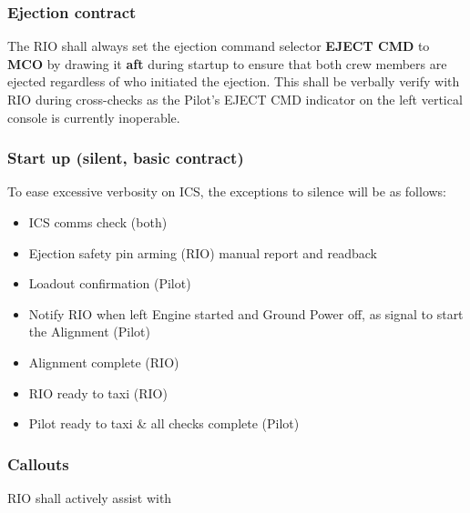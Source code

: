 \subsubsection{Ejection contract}

The RIO shall always set the ejection command selector \textbf{EJECT CMD} to
\textbf{MCO} by drawing it \textbf{aft} during startup to ensure that both crew
members are ejected regardless of who initiated the ejection. This shall be
verbally verify with RIO during cross-checks as the Pilot's EJECT
CMD indicator on the left vertical console is currently inoperable.

\subsubsection{Start up (silent, basic contract)}

To ease excessive verbosity on ICS, the exceptions to silence will be as
follows:

\begin{itemize}
  \item ICS comms check (both)

  \item Ejection safety pin arming (RIO) manual report and readback

  \item Loadout confirmation (Pilot)

  \item Notify RIO when left Engine started and Ground Power off, as signal to
    start the Alignment (Pilot)

  \item Alignment complete (RIO)

  \item RIO ready to taxi (RIO)

  \item Pilot ready to taxi \& all checks complete (Pilot)

\end{itemize}

\subsubsection{Callouts}

RIO shall actively assist with

